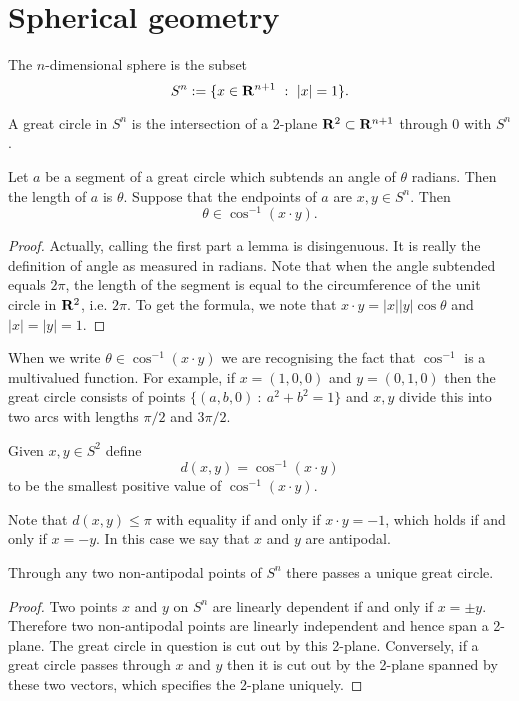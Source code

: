 \documentclass[12pt]{article}
\begin{document}
\newpage

\section{Spherical geometry}

\begin{dfn}
  The $n$-dimensional sphere is the subset
  \[S^n:=\{x\in\RR^{n+1}\ :\ |x|=1\}.\]
\end{dfn}

\begin{dfn}
  A great circle in $S^n$ is the intersection of a 2-plane $\mathbf{R}^2\subset\mathbf{R}^{n+1}$ through $0$ with $S^n$.
\end{dfn}

\begin{lma}
  Let $a$ be a segment of a great circle which subtends an angle of $\theta$ radians. Then the length of $a$ is $\theta$. Suppose that the endpoints of $a$ are $x,y\in S^n$. Then
  \[\theta\in\cos^{-1}(x\cdot y).\]
\end{lma}
\begin{proof}
  Actually, calling the first part a lemma is disingenuous. It is really the definition of angle as measured in radians. Note that when the angle subtended equals $2\pi$, the length of the segment is equal to the circumference of the unit circle in $\mathbf{R}^2$, i.e. $2\pi$. To get the formula, we note that $x\cdot y=|x||y|\cos\theta$ and $|x|=|y|=1$.
\end{proof}

When we write $\theta\in\cos^{-1}(x\cdot y)$ we are recognising the fact that $\cos^{-1}$ is a multivalued function. For example, if $x=(1,0,0)$ and $y=(0,1,0)$ then the great circle consists of points $\{(a,b,0)\ :\ a^2+b^2=1\}$ and $x,y$ divide this into two arcs with lengths $\pi/2$ and $3\pi/2$.

\begin{dfn}
  Given $x,y\in S^2$ define
  \[d(x,y)=\cos^{-1}(x\cdot y)\]
  to be the smallest positive value of $\cos^{-1}(x\cdot y)$.
\end{dfn}

\begin{rmk}
  Note that $d(x,y)\leq \pi$ with equality if and only if $x\cdot y=-1$, which holds if and only if $x=-y$. In this case we say that $x$ and $y$ are antipodal.
\end{rmk}

\begin{lma}
  Through any two non-antipodal points of $S^n$ there passes a unique great circle.
\end{lma}
\begin{proof}
  Two points $x$ and $y$ on $S^n$ are linearly dependent if and only if $x=\pm y$. Therefore two non-antipodal points are linearly independent and hence span a 2-plane. The great circle in question is cut out by this 2-plane. Conversely, if a great circle passes through $x$ and $y$ then it is cut out by the 2-plane spanned by these two vectors, which specifies the 2-plane uniquely.
\end{proof}
\end{document}
